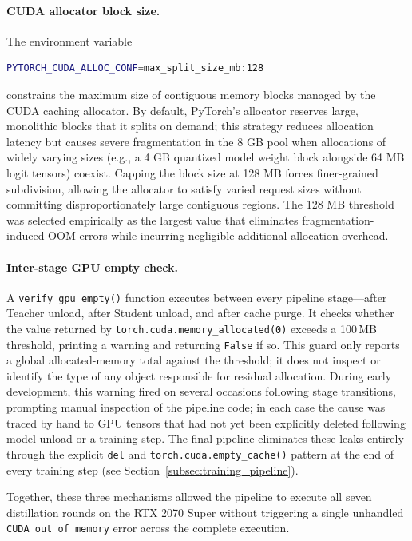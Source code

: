 \documentclass[11pt, a4paper]{article}
\begin{document}
\paragraph{CUDA allocator block size.}
The environment variable
\begin{lstlisting}[language=bash]
PYTORCH_CUDA_ALLOC_CONF=max_split_size_mb:128
\end{lstlisting}
constrains the maximum size of contiguous memory blocks managed by the CUDA caching allocator. By default, PyTorch's allocator reserves large, monolithic blocks that it splits on demand; this strategy reduces allocation latency but causes severe fragmentation in the 8 GB pool when allocations of widely varying sizes (e.g., a 4 GB quantized model weight block alongside 64 MB logit tensors) coexist. Capping the block size at 128 MB forces finer-grained subdivision, allowing the allocator to satisfy varied request sizes without committing disproportionately large contiguous regions. The 128 MB threshold was selected empirically as the largest value that eliminates fragmentation-induced OOM errors while incurring negligible additional allocation overhead.

\paragraph{Inter-stage GPU empty check.}
A \texttt{verify\_gpu\_empty()} function executes between every pipeline stage---after Teacher unload, after Student unload, and after cache purge. It checks whether the value returned by \texttt{torch.cuda.memory\_allocated(0)} exceeds a 100\,MB threshold, printing a warning and returning \texttt{False} if so. This guard only reports a global allocated-memory total against the threshold; it does not inspect or identify the type of any object responsible for residual allocation. During early development, this warning fired on several occasions following stage transitions, prompting manual inspection of the pipeline code; in each case the cause was traced by hand to GPU tensors that had not yet been explicitly deleted following model unload or a training step. The final pipeline eliminates these leaks entirely through the explicit \texttt{del} and \texttt{torch.cuda.empty\_cache()} pattern at the end of every training step (see Section~\ref{subsec:training_pipeline}).

Together, these three mechanisms allowed the pipeline to execute all seven distillation rounds on the RTX 2070 Super without triggering a single unhandled \texttt{CUDA out of memory} error across the complete execution.
\end{document}

